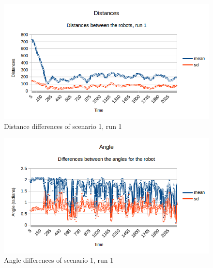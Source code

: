 \begin{figure}[H]
    \centering
    \includegraphics[width=\textwidth]{figs/scenario1_run1/dist.png}
    \caption[Distances]{Distance differences of scenario 1, run 1}
    \label{fig:distance11}
\end{figure}
\begin{figure}[H]
    \centering
    \includegraphics[width=\textwidth]{figs/scenario1_run1/angle.png}
    \caption[Angles]{Angle differences of scenario 1, run 1}
    \label{fig:angle11}
\end{figure}

